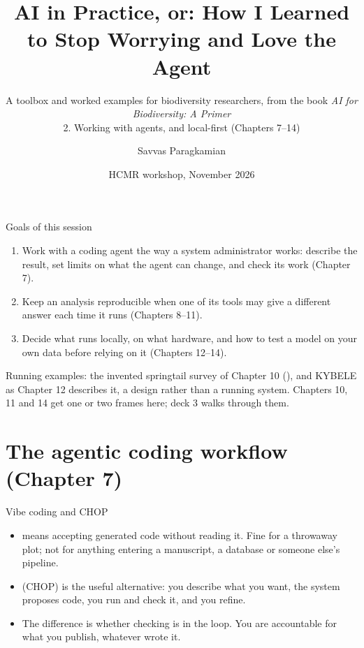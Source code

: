 \documentclass[11pt,aspectratio=169]{beamer}
\title[AI in Practice 2]{AI in Practice, or: How I Learned to Stop Worrying and Love the Agent}
\subtitle{A toolbox and worked examples for biodiversity researchers, from the book \emph{AI for Biodiversity: A Primer}\\[0.6em] 2. Working with agents, and local-first (Chapters 7--14)}
\author{Savvas Paragkamian}
\institute{Hellenic Centre for Marine Research \\ KYBELE and ELIXIR-GR}
\date{HCMR workshop, November 2026}
\begin{document}
\begin{frame}[plain]
  \titlepage
\end{frame}

\begin{frame}{Goals of this session}
  \begin{enumerate}
    \item Work with a coding agent the way a system administrator works:
      describe the result, set limits on what the agent can change, and
      check its work (Chapter 7).
    \item Keep an analysis reproducible when one of its tools may give a
      different answer each time it runs (Chapters 8--11).
    \item Decide what runs locally, on what hardware, and how to test a
      model on your own data before relying on it (Chapters 12--14).
  \end{enumerate}
  \medskip
  Running examples: the invented springtail survey of Chapter 10
  (), and KYBELE as Chapter 12 describes it, a
  design rather than a running system. Chapters 10, 11 and 14 get one or
  two frames here; deck 3 walks through them.
\end{frame}

\section{The agentic coding workflow (Chapter 7)}

\begin{frame}{Vibe coding and CHOP}
  \begingroup{}\endgroup
  \begin{itemize}
    \item {} means accepting generated code without reading
      it. Fine for a throwaway plot; not for anything entering a manuscript,
      a database or someone else's pipeline.
    \item {} (CHOP) is the useful alternative:
      you describe what you want, the system proposes code, you run and
      check it, and you refine.
    \item The difference is whether checking is in the loop. You are
      accountable for what you publish, whatever wrote it.
  \end{itemize}
\end{frame}
\end{document}
